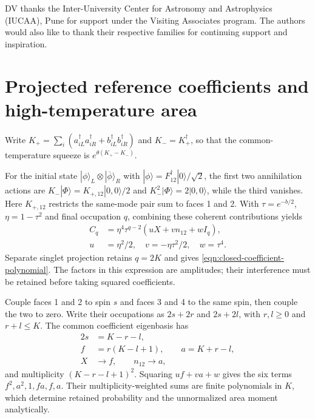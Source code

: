 \documentclass[twocolumn,draft,aps,nofootinbib,nobibnotes,final]{revtex4-2}
\begin{document}
\begin{acknowledgements}
	DV thanks the Inter-University Center for Astronomy and Astrophysics (IUCAA), Pune for support under the Visiting Associates program. The authors would also like to thank their respective families for continuing support and inspiration.
\end{acknowledgements}

\appendix

\section{Projected reference coefficients and high-temperature area}\label{app:projected-area}

Write $K_+=\sum_i(a_{iL}^{\dagger}a_{iR}^{\dagger}+b_{iL}^{\dagger}b_{iR}^{\dagger})$ and $K_-=K_+^{\dagger}$, so that the common-temperature squeeze is $e^{\theta(K_+-K_-)}$.

For the initial state $|\phi\rangle_L\otimes|\overline\phi\rangle_R$ with $|\phi\rangle=F_{12}^{\dagger}|0\rangle/\sqrt2$, the first two annihilation actions are $K_-|\Phi\rangle=K_{+,12}|0,0\rangle/2$ and $K_-^2|\Phi\rangle=2|0,0\rangle$, while the third vanishes. Here $K_{+,12}$ restricts the same-mode pair sum to faces 1 and 2. With $\tau=e^{-b/2}$, $\eta=1-\tau^2$ and final occupation $q$, combining these coherent contributions yields
\begin{equation}
\begin{aligned}
 C_q&=\eta^4\tau^{q-2}(uX+v n_{12}+wI_q),\\
 u&=\eta^2/2,\quad v=-\eta\tau^2/2,\quad w=\tau^4.
\end{aligned}
\end{equation}
Separate singlet projection retains $q=2K$ and gives \eqref{eqn:closed-coefficient-polynomial}. The factors in this expression are amplitudes; their interference must be retained before taking squared coefficients.

Couple faces 1 and 2 to spin $s$ and faces 3 and 4 to the same spin, then couple the two to zero. Write their occupations as $2s+2r$ and $2s+2l$, with $r,l\ge0$ and $r+l\le K$. The common coefficient eigenbasis has
\begin{equation}
\begin{aligned}
 2s&=K-r-l,\\
 f&=r(K-l+1),\qquad a=K+r-l,\\
 X&\longrightarrow f,\qquad n_{12}\longrightarrow a,
\end{aligned}
\end{equation}
and multiplicity $(K-r-l+1)^2$. Squaring $uf+va+w$ gives the six terms $f^2,a^2,1,fa,f,a$. Their multiplicity-weighted sums are finite polynomials in $K$, which determine retained probability and the unnormalized area moment analytically.
\end{document}
